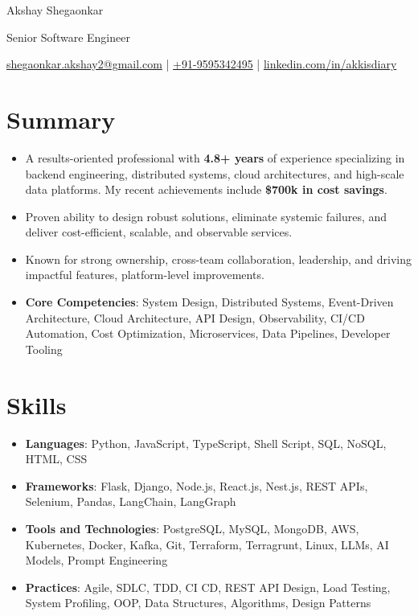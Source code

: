 \documentclass[11pt]{article}       %
\begin{document}
\centerline{\Huge Akshay Shegaonkar}
\centerline{\Large Senior Software Engineer}
\vspace{4pt}
\centerline{
  \href{mailto:shegaonkar.akshay2@gmail.com}{shegaonkar.akshay2@gmail.com} | \href{tel:+919595342495}{+91-9595342495} | \href{https://www.linkedin.com/in/akkisdiary}{linkedin.com/in/akkisdiary}
}

\section*{Summary}

\begin{itemize}
  \item A results-oriented professional with \textbf{4.8+ years} of experience specializing in backend engineering, distributed systems, cloud architectures, and high-scale data platforms. My recent achievements include \textbf{\$700k in cost savings}. \\
  \item Proven ability to design robust solutions, eliminate systemic failures, and deliver cost-efficient, scalable, and observable services. \\
  \item Known for strong ownership, cross-team collaboration, leadership, and driving impactful features, platform-level improvements. \\
  \item \textbf{Core Competencies}: System Design, Distributed Systems, Event-Driven Architecture, Cloud Architecture, API Design, Observability, CI/CD Automation, Cost Optimization, Microservices, Data Pipelines, Developer Tooling \\
\end{itemize}

\section*{Skills}

\begin{itemize}
  \item \textbf{Languages}: Python, JavaScript, TypeScript, Shell Script, SQL, NoSQL, HTML, CSS \\
  \item \textbf{Frameworks}: Flask, Django, Node.js, React.js, Nest.js, REST APIs, Selenium, Pandas, LangChain, LangGraph \\
  \item \textbf{Tools and Technologies}: PostgreSQL, MySQL, MongoDB, AWS, Kubernetes, Docker, Kafka, Git, Terraform, Terragrunt, Linux, LLMs, AI Models, Prompt Engineering \\
  \item \textbf{Practices}: Agile, SDLC, TDD, CI CD, REST API Design, Load Testing, System Profiling, OOP, Data Structures, Algorithms, Design Patterns \\
\end{itemize}
\end{document}
